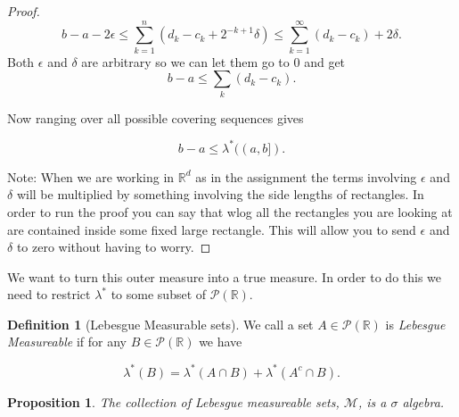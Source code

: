 \documentclass[
]{book}
\newtheorem{proposition}{Proposition}[chapter]
\theoremstyle{definition}
\newtheorem{definition}{Definition}[chapter]
\theoremstyle{definition}
\theoremstyle{definition}
\theoremstyle{definition}
\theoremstyle{remark}
\begin{document}
\begin{proof}
\[ b-a - 2\epsilon \leq \sum_{k=1}^n (d_k - c_k + 2^{-k+1} \delta) \leq \sum_{k=1}^\infty (d_k-c_k) + 2 \delta. \] Both $\epsilon$ and $\delta$ are arbitrary so we can let them go to $0$ and get
\[ b-a \leq \sum_k (d_k - c_k). \]

Now ranging over all possible covering sequences gives

\[ b-a \leq \lambda^*((a,b]). \]

Note: When we are working in \(\mathbb{R}^d\) as in the assignment the terms involving \(\epsilon\) and \(\delta\) will be multiplied by something involving the side lengths of rectangles. In order to run the proof you can say that wlog all the rectangles you are looking at are contained inside some fixed large rectangle. This will allow you to send \(\epsilon\) and \(\delta\) to zero without having to worry.
\end{proof}

We want to turn this outer measure into a true measure. In order to do this we need to restrict \(\lambda^*\) to some subset of \(\mathscr{P}(\mathbb{R})\).

\begin{definition}[Lebesgue Measurable sets]
We call a set \(A \in \mathscr{P}(\mathbb{R})\) is \emph{Lebesgue Measureable} if for any \(B \in \mathscr{P}(\mathbb{R})\) we have

\[ \lambda^*(B) = \lambda^*(A \cap B) + \lambda^*(A^c \cap B). \]
\end{definition}

\begin{proposition}
The collection of Lebesgue measureable sets, \(\mathscr{M}\), is a \(\sigma\) algebra.
\end{proposition}
\end{document}

